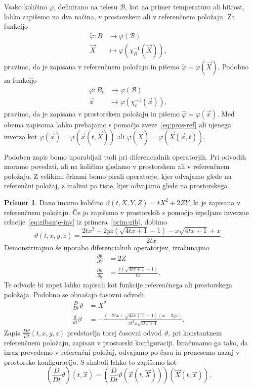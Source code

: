 \documentclass[12pt,a4paper,twoside]{article}
\theoremstyle{definition} %
\newtheorem{primer}[definicija]{Primer}
\theoremstyle{plain} %
\numberwithin{equation}{section}
\newcommand{\B}{\mathcal{B}}
\renewcommand{\phi}{\varphi}
\newcommand{\dpar}[2]{\ensuremath{\frac{\partial #1}{\partial #2}}}
\newcommand{\dd}[2]{\ensuremath{\frac{d #1}{d #2}}}
\newcommand{\ddt}[1]{\dd{#1}{t}}
\newcommand{\DD}[2]{\ensuremath{\frac{D #1}{D #2}}}
\newcommand{\DDt}[1]{\DD{#1}{t}}
\newcommand{\vX}{\vec{X}}
\newcommand{\vx}{\vec{x}}
\begin{document}
Vsako količino $\phi$, definirano na telesu $\B$, kot na primer temperaturo ali hitrost, lahko
zapišemo na dva načina, v prostorskem ali v referenčnem položaju. Za funkcijo
\begin{align}
  \tilde \phi\colon B &\to \phi(\B) \nonumber \\
  \vX&\mapsto \phi(\chi_R^{-1}(\vX)), \label{eq:toref}
\end{align}
pravimo, da je zapisana v referenčnem položaju in pišemo $\tilde\phi =
\phi(\vX)$.
Podobno za funkcijo
\begin{align}
  \hat \phi\colon B_t &\to \phi(\B) \nonumber \\
  \vx&\mapsto \phi(\chi_t^{-1}(\vx)), \label{eq:topro}
\end{align}
pravimo, da je zapisana v prostorskem položaju in pišemo $\hat\phi = \phi(\vx)$.
Med obema zapisoma lahko prehajamo s pomočjo zveze~\eqref{eq:pros-ref} ali njenega inverza kot
$\phi(\vx) = \phi(\vx(t, \vX))$ ali $\phi(\vX) = \phi(\vX(\vx, t))$.

Podoben zapis bomo uporabljali tudi pri diferencialnih operatorjih. Pri odvodih
moramo povedati, ali na količino gledamo v prostorskem ali v referenčnem
položaju. Z velikimi črkami bomo pisali operatorje, kjer odvajamo glede na
referenčni položaj, z malimi pa tiste, kjer odvajamo glede na prostorskega.

\begin{primer}
  Dano imamo količino $\vartheta(t, X, Y, Z) = tX^2 + 2 ZY$, ki je zapisana v
  referenčnem položaju. Če jo zapišemo v prostorskih s pomočjo izpeljane
  inverzne relacije~\eqref{eq:gibanje-inv} iz primera~\ref{prim:gib}, dobimo
  \[
    \vartheta(t, x, y, z) = \frac{2 t x^2+2 y z \left(\sqrt{4 t x+1}-1\right)-x
    \sqrt{4 t x+1}+x}{2 t x}.
  \]
  Demonstrirajmo še uporabo diferencialnih operatorjev, izračunajmo
  \begin{align}
    \dpar{\vartheta}{Y} &= 2Z  \\
    \dpar{\vartheta}{y} &= \frac{z \left(\sqrt{4 t x+1}-1\right)}{t x}.
  \end{align}
  Te odvode bi zopet lahko zapisali kot funkcije referenčnega ali prostorskega položaja. Podobno se
  obnašajo časovni odvodi.
  \begin{align}
    \DDt{} \vartheta &= X^2 \\
    \ddt{} \vartheta &=  -\frac{\left(-2 t x+\sqrt{4 t x+1}-1\right) (x-2 y
    z)}{2 t^2 x \sqrt{4 t x+1}}.
  \end{align}
  Zapis $\DDt \vartheta(t, x, y, z)$ predstavlja torej časovni odvod $\vartheta$, pri konstantnem
  referenčnem položaju, zapisan v prostorski konfiguraciji. Izračunamo ga tako, da izraz prevedemo
  v referenčni položaj, odvajamo po času in prenesemo nazaj v prostorsko konfiguracijo. S simboli
  lahko to zapišemo kot
  \begin{equation}
    \left(\DDt{} \vartheta\right)(t, \vx) = \left( \DDt{}\vartheta(\vx(t, \vX))
    \right)(\vX(t, \vx)).
  \end{equation}
\end{primer}
\end{document}
